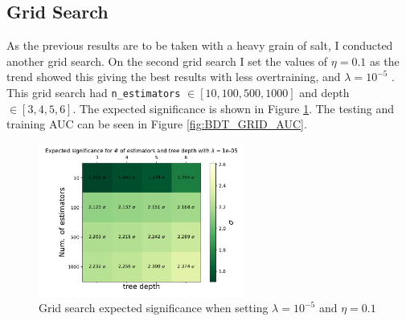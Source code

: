 \documentclass[12pt, a4paper]{book}
\begin{document}
\subsection{Grid Search}\label{sec:BDTGriddy_res}
As the previous results are to be taken with a heavy grain of salt, I conducted another grid search. On the second grid search I set the values of $\eta=0.1$ as the trend showed this giving the best results with less overtraining, 
and $\lambda=10^{-5}$ . This grid search had \verb|n_estimators| $\in[10, 100, 500, 1000]$ and depth $\in[3,4,5,6]$. 
The expected significance is shown in Figure \ref{fig:BDT_sig}. The testing and training AUC can be seen in Figure \ref{fig:BDT_GRID_AUC}.
\graphicspath{{../../../Plots/XGBoost/FULL/GRIDSEARCH_n_est_10-1000}}
\begin{figure}[!ht]
   \centering
   \includegraphics[width=0.6\textwidth]{Expected_significance.pdf}  
   \caption{Grid search expected significance when setting $\lambda=10^{-5}$ and $\eta=0.1$}\label{fig:BDT_sig}
\end{figure}
\end{document}

